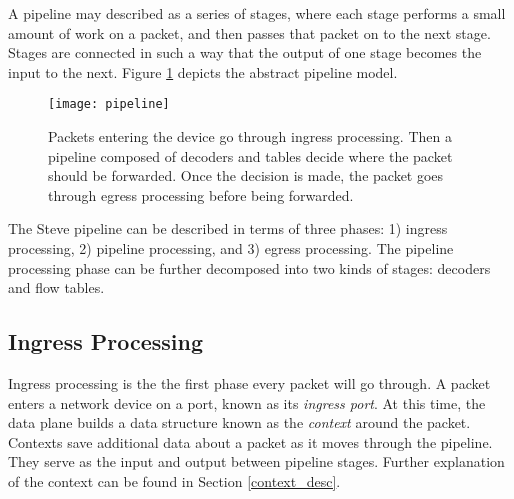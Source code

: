 A pipeline may described as a series of stages, where each stage performs
a small amount of work on a packet, and then passes that packet on to the
next stage.
Stages are connected in such a way that the output of
one stage becomes the input to the next. 
Figure \ref{fg:pipeline_model} depicts the abstract pipeline model.



\begin{figure} [ht] 
\texttt{[image: pipeline]}
\caption{Packets entering the device go through ingress processing.
Then a pipeline composed of decoders and tables decide where the packet
should be forwarded. Once the decision is made, the packet goes through
egress processing before being forwarded.} 
\label{fg:pipeline_model} 
\end{figure}

The Steve pipeline can be described in terms of three phases: 
1) ingress processing, 2) pipeline processing, and 3) egress processing. 
The pipeline processing phase can be further decomposed into two kinds
of stages: decoders and flow tables.



\subsection{Ingress Processing} \label{ingress_desc}

Ingress processing is the the first phase every packet will go through.
A packet enters a network device on a port, known as its \emph{ingress port}.
At this time, the data plane builds a data structure known as the
\emph{context} around the packet. 
Contexts save additional data about a packet as it moves through the pipeline.
They serve as the input and output between pipeline stages.
Further explanation of the context can be found in Section \ref{context_desc}.

